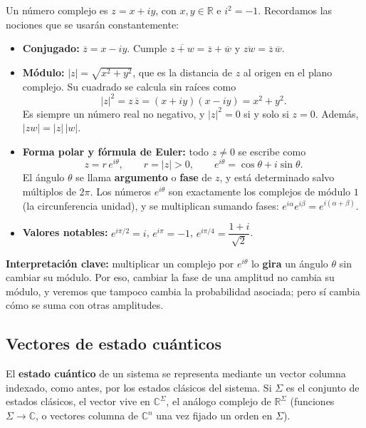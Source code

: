 \documentclass[11pt, a4paper, twoside, openright]{report}
\begin{document}
\begin{tcolorbox}[colback=teal!5!white,colframe=teal!75!black,title=\textbf{Repaso: Números complejos}]
Un número complejo es $z = x + iy$, con $x, y \in \mathbb{R}$ e $i^2 = -1$. Recordamos las nociones que se usarán constantemente:
\begin{itemize}
    \item \textbf{Conjugado:} $\overline{z} = x - iy$. Cumple $\overline{z + w} = \overline{z} + \overline{w}$ y $\overline{zw} = \overline{z}\,\overline{w}$.
    \item \textbf{Módulo:} $|z| = \sqrt{x^2 + y^2}$, que es la distancia de $z$ al origen en el plano complejo. Su cuadrado se calcula sin raíces como
    \[ |z|^2 = z\,\overline{z} = (x+iy)(x-iy) = x^2 + y^2. \]
    Es siempre un número real no negativo, y $|z|^2 = 0$ si y solo si $z = 0$. Además, $|zw| = |z|\,|w|$.
    \item \textbf{Forma polar y fórmula de Euler:} todo $z \neq 0$ se escribe como
    \[ z = r\, e^{i\theta}, \qquad r = |z| > 0, \qquad e^{i\theta} = \cos\theta + i \sin\theta. \]
    El ángulo $\theta$ se llama \textbf{argumento} o \textbf{fase} de $z$, y está determinado salvo múltiplos de $2\pi$. Los números $e^{i\theta}$ son exactamente los complejos de módulo $1$ (la circunferencia unidad), y se multiplican sumando fases: $e^{i\alpha}e^{i\beta} = e^{i(\alpha+\beta)}$.
    \item \textbf{Valores notables:} $e^{i\pi/2} = i$, \; $e^{i\pi} = -1$, \; $e^{i\pi/4} = \dfrac{1+i}{\sqrt{2}}$.
\end{itemize}
\textbf{Interpretación clave:} multiplicar un complejo por $e^{i\theta}$ lo \textbf{gira} un ángulo $\theta$ sin cambiar su módulo. Por eso, cambiar la fase de una amplitud no cambia su módulo, y veremos que tampoco cambia la probabilidad asociada; pero sí cambia cómo se suma con otras amplitudes.
\end{tcolorbox}

\subsection{Vectores de estado cuánticos}

\noindent El \textbf{estado cuántico} de un sistema se representa mediante un vector columna indexado, como antes, por los estados clásicos del sistema. Si $\Sigma$ es el conjunto de estados clásicos, el vector vive en $\mathbb{C}^\Sigma$, el análogo complejo de $\mathbb{R}^\Sigma$ (funciones $\Sigma \to \mathbb{C}$, o vectores columna de $\mathbb{C}^n$ una vez fijado un orden en $\Sigma$).
\end{document}

